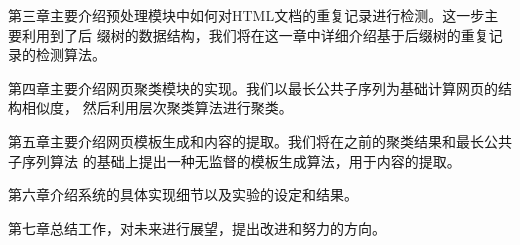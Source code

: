 第三章主要介绍预处理模块中如何对HTML文档的重复记录进行检测。这一步主要利用到了后
缀树的数据结构，我们将在这一章中详细介绍基于后缀树的重复记录的检测算法。

第四章主要介绍网页聚类模块的实现。我们以最长公共子序列为基础计算网页的结构相似度，
然后利用层次聚类算法进行聚类。

第五章主要介绍网页模板生成和内容的提取。我们将在之前的聚类结果和最长公共子序列算法
的基础上提出一种无监督的模板生成算法，用于内容的提取。

第六章介绍系统的具体实现细节以及实验的设定和结果。

第七章总结工作，对未来进行展望，提出改进和努力的方向。



